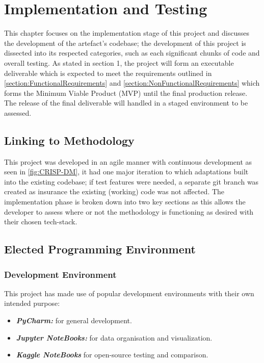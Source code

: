 \chapter{Implementation and Testing}

This chapter focuses on the implementation stage of this project and discusses the development of the artefact's codebase; the development of this project is dissected into its respected categories, such as each significant chunks of code and overall testing. As stated in section 1, the project will form an executable deliverable which is expected to meet the requirements outlined in \autoref{section:FunctionalRequirements} and \autoref{section:NonFunctionalRequirements} which forms the Minimum Viable Product (MVP) until the final production release. The release of the final deliverable will handled in a staged environment to be assessed.

\section{Linking to Methodology}

This project was developed in an agile manner with continuous development as seen in \autoref{fig:CRISP-DM}, it had one major iteration to which adaptations built into the existing codebase; if test features were needed, a separate git branch was created as insurance the existing (working) code was not affected. The implementation phase is broken down into two key sections as this allows the developer to assess where or not the methodology is functioning as desired with their chosen tech-stack.

\section{Elected Programming Environment}

\subsection{Development Environment}

This project has made use of popular development environments with their own intended purpose:
\begin{itemize}
    \item \textbf{\textit{PyCharm:}} for general development.
    \item \textbf{\textit{Jupyter NoteBooks:}} for data organisation and visualization.
    \item \textbf{\textit{Kaggle NoteBooks}} for open-source testing and comparison.
\end{itemize}


